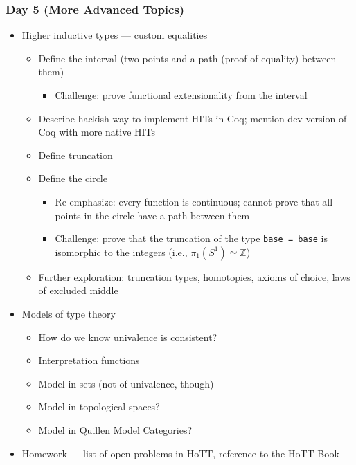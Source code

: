\documentclass{article}
\begin{document}
\subsubsection*{Day 5 (More Advanced Topics)}
\begin{itemize}
  \item Higher inductive types --- custom equalities
    \begin{itemize}
      \item Define the interval (two points and a path (proof of equality) between them)
      \begin{itemize}
        \item Challenge: prove functional extensionality from the interval
      \end{itemize}
      \item Describe hackish way to implement HITs in Coq; mention dev version of Coq with more native HITs
      \item Define truncation
      \item Define the circle
      \begin{itemize}
        \item Re-emphasize: every function is continuous; cannot prove that all points in the circle have a path between them
        \item Challenge: prove that the truncation of the type \texttt{base = base} is isomorphic to the integers (i.e., $\pi_1(S^1) \simeq \mathbb{Z}$)
      \end{itemize}
      \item Further exploration: truncation types, homotopies, axioms of choice, laws of excluded middle
  \end{itemize}
  \item Models of type theory
  \begin{itemize}
    \item How do we know univalence is consistent?
    \item Interpretation functions
    \item Model in sets (not of univalence, though)
    \item Model in topological spaces?
    \item Model in Quillen Model Categories?
  \end{itemize}
  \item Homework --- list of open problems in HoTT, reference to the HoTT Book
\end{itemize}
\end{document}
